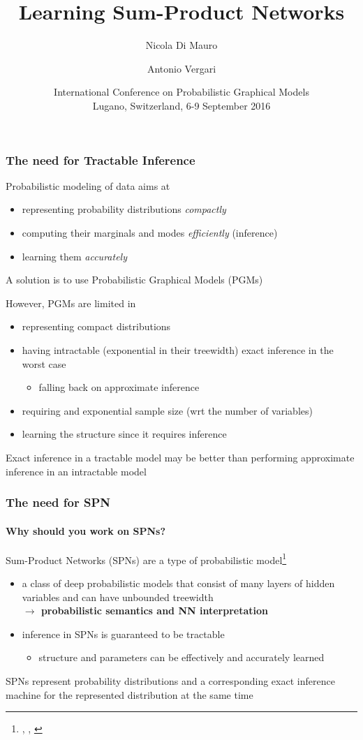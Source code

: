 \documentclass[10pt, t, xcolor={usenames,dvipsnames,svgnames}, compress]{beamer}
\title{Learning Sum-Product Networks}
\author{\small Nicola Di Mauro \and Antonio Vergari}
\date{\scriptsize International Conference on Probabilistic Graphical Models\\
 Lugano, Switzerland, 6-9 September 2016}
\institute{\scriptsize Università degli Studi di Bari}
\newcommand{\customcite}[1]{\footnote{\scriptsize \citeauthor{#1}, \citetitle{#1}, \citeyear{#1}}}
\begin{document}
\begin{frame}[c]
  \titlepage
\end{frame}

\begin{frame}
\frametitle{The need for Tractable Inference}

Probabilistic modeling of data aims at
\begin{itemize}
  \item representing probability distributions \emph{compactly}
  \item computing their marginals and modes \emph{efficiently} (inference)
  \item learning them \emph{accurately}
\end{itemize}
A solution is to use Probabilistic Graphical Models (PGMs)

However, PGMs are limited in
\begin{itemize}
\item representing compact distributions
\item having intractable (exponential in their treewidth) exact inference in the worst case 
  \begin{itemize}
  \item falling back on approximate inference
  \end{itemize}
\item requiring and exponential sample size (wrt the number of variables)
\item learning the structure since it requires inference
\end{itemize}
Exact inference in a tractable model may be better than performing approximate
inference in an intractable model
\end{frame}

\begin{frame}
  \frametitle{The need for SPN }
  \framesubtitle{Why should you work on SPNs?}

Sum-Product Networks (SPNs) are a type of probabilistic model\customcite{Poon2011}
\begin{itemize}
\item a class of deep probabilistic  models  that  consist  of  many  layers  of
  hidden variables and can have unbounded treewidth\\ 
  \hfill {\color{violet} \textbf{$\rightarrow$ probabilistic semantics and NN interpretation}}
\item inference in SPNs is guaranteed to be tractable
\begin{itemize}
\item structure and parameters can be effectively and accurately learned
\end{itemize}
\end{itemize}
SPNs represent probability distributions and a corresponding exact inference
machine for the represented distribution at the same time 
\end{frame}
\end{document}

